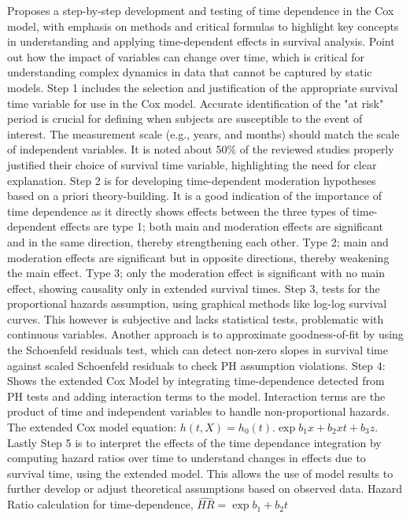 \noindent \parencite{woo_time_2023} Proposes a step-by-step development and testing of time dependence in the Cox model, with emphasis on methods and critical formulas to highlight key concepts in understanding and applying time-dependent effects in survival analysis. \parencite{woo_time_2023} Point out how the impact of variables can change over time, which is critical for understanding complex dynamics in data that cannot be captured by static models. Step 1 includes the selection and justification of the appropriate survival time variable for use in the Cox model. Accurate identification of the "at risk" period is crucial for defining when subjects are susceptible to the event of interest. The measurement scale (e.g., years, and months) should match the scale of independent variables. It is noted about 50\% of the reviewed studies properly justified their choice of survival time variable, highlighting the need for clear explanation. Step 2 is for developing time-dependent moderation hypotheses based on a priori theory-building. It is a good indication of the importance of time dependence as it directly shows effects between \parencite{woo_time_2023} the three types of time-dependent effects are type 1; both main and moderation effects are significant and in the same direction, thereby strengthening each other. Type 2; main and moderation effects are significant but in opposite directions, thereby weakening the main effect. Type 3; only the moderation effect is significant with no main effect, showing causality only in extended survival times. Step 3, tests for the proportional hazards assumption, using graphical methods like log-log survival curves. \parencite{woo_time_2023} This however is subjective and lacks statistical tests, problematic with continuous variables. Another approach is to approximate goodness-of-fit by using the Schoenfeld residuals test, which can detect non-zero slopes in survival time against scaled Schoenfeld residuals to check PH assumption violations. Step 4: Shows the extended Cox Model by integrating time-dependence detected from PH tests and adding interaction terms to the model. Interaction terms are the product of time and independent variables to handle non-proportional hazards. The extended Cox model equation: \(h(t,X) = h_{0}(t).\exp{b_{1}x+b_{2}xt+b_{3}z}\). Lastly Step 5 is to interpret the effects of the time dependance integration by computing hazard ratios over time to understand changes in effects due to survival time, using the extended model. \parencite{woo_time_2023} This allows the use of model results to further develop or adjust theoretical assumptions based on observed data. Hazard Ratio calculation for time-dependence, \(\hat{HR} = \exp{b_{1}+b_{2}t}\)

